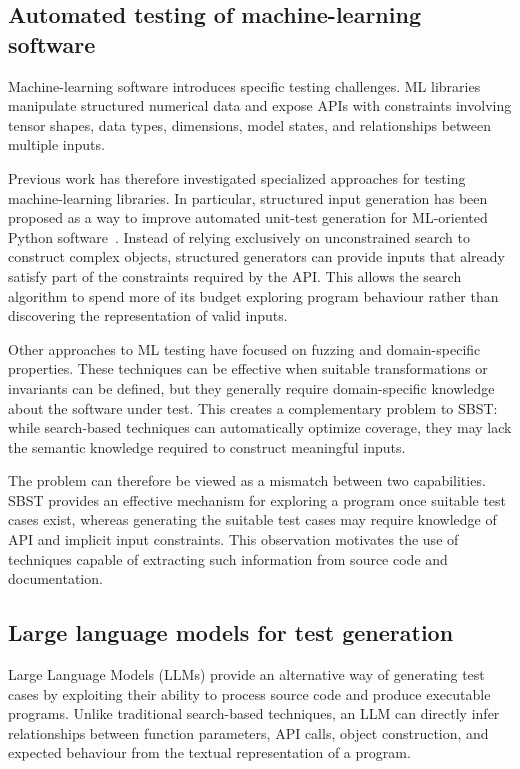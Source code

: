 \documentclass{article}
\begin{document}
\subsection{Automated testing of machine-learning software}
Machine-learning software introduces specific testing challenges. ML libraries manipulate structured numerical data and expose APIs with constraints involving tensor shapes, data types, dimensions, model states, and relationships between multiple inputs.

Previous work has therefore investigated specialized approaches for testing machine-learning libraries. In particular, structured input generation has been proposed as a way to improve automated unit-test generation for ML-oriented Python software~\cite{Lucas_Berg_Improving_automated_unit_test_generation_for_machine_learning_libraries_using_structured_input_data_2024}. Instead of relying exclusively on unconstrained search to construct complex objects, structured generators can provide inputs that already satisfy part of the constraints required by the API. This allows the search algorithm to spend more of its budget exploring program behaviour rather than discovering the representation of valid inputs.

Other approaches to ML testing have focused on fuzzing and domain-specific properties. These techniques can be effective when suitable transformations or invariants can be defined, but they generally require domain-specific knowledge about the software under test. This creates a complementary problem to SBST: while search-based techniques can automatically optimize coverage, they may lack the semantic knowledge required to construct meaningful inputs.

The problem can therefore be viewed as a mismatch between two capabilities. SBST provides an effective mechanism for exploring a program once suitable test cases exist, whereas generating the suitable test cases may require knowledge of API and implicit input constraints. This observation motivates the use of techniques capable of extracting such information from source code and documentation.

\subsection{Large language models for test generation}
Large Language Models (LLMs) provide an alternative way of generating test cases by exploiting their ability to process source code and produce executable programs. Unlike traditional search-based techniques, an LLM can directly infer relationships between function parameters, API calls, object construction, and expected behaviour from the textual representation of a program.
\end{document}
